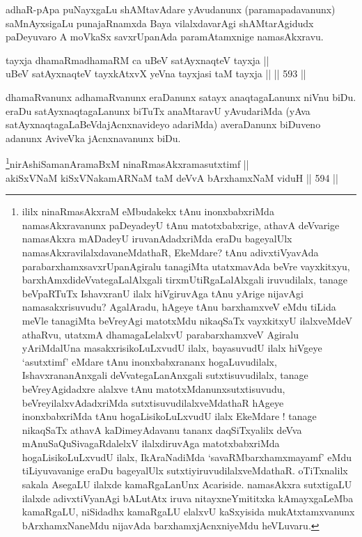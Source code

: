 \begin{artha}
adhaR-pApa puNayxgaLu shAMtavAdare yAvudanunx
(paramapadavanunx) saMnAyxsigaLu punajaRnamxda Baya vilalxdavarAgi
shAMtarAgidudx paDeyuvaro A moVkaSx savxrUpanAda paramAtamxnige
namasAkxravu.
\end{artha}


\begin{shl}
tayxja dhamaRmadhamaRM ca uBeV satAyxnaqteV tayxja || \\
uBeV satAyxnaqteV tayxkAtxvX yeVna tayxjasi taM tayxja ||  \hfill || 593 ||  
\end{shl}

\begin{artha}
dhamaRvanunx adhamaRvanunx eraDanunx satayx anaqtagaLanunx niVnu
biDu. eraDu satAyxnaqtagaLanunx biTuTx anaMtaravU yAvudariMda (yAva
satAyxnaqtagaLaBeVdajAcnxnavideyo adariMda) averaDanunx biDuveno
adanunx AviveVka jAcnxnavanunx biDu.
\end{artha}


\begin{shl}
\footnote{ililx ninaRmasAkxraM eMbudakekx tAnu inonxbabxriMda
namasAkxravanunx paDeyadeyU tAnu matotxbabxrige, athavA deVvarige
namasAkxra mADadeyU iruvanAdadxriMda eraDu bageyalUlx
namasAkxravilalxdavaneMdathaR, EkeMdare? tAnu adivxtiVyavAda
parabarxhamxsavxrUpanAgiralu tanagiMta utatxmavAda beVre vayxkitxyu,
barxhAmxdideVvategaLalAlxgali tirxmUtiRgaLalAlxgali iruvudilalx,
tanage beVpaRTuTx IshavxranU ilalx hiVgiruvAga tAnu yArige nijavAgi
namasakxrisuvudu? AgalAradu, hAgeye tAnu barxhamxveV eMdu tiLida
meVle tanagiMta beVreyAgi matotxMdu nikaqSaTx vayxkitxyU ilalxveMdeV
athaRvu, utatxmA dhamagaLelalxvU parabarxhamxveV Agiralu yAriMdalUna
masakxrisikoLuLxvudU ilalx, bayasuvudU ilalx hiVgeye `asutxtimf'
eMdare tAnu inonxbabxrananx hogaLuvudilalx, IshavxrananAnxgali
deVvategaLanAnxgali sutxtisuvudilalx, tanage beVreyAgidadxre alalxve
tAnu matotxMdanunxsutxtisuvudu, beVreyilalxvAdadxriMda
sutxtisuvudilalxveMdathaR hAgeye inonxbabxriMda tAnu
hogaLisikoLuLxvudU ilalx EkeMdare ! tanage nikaqSaTx athavA
kaDimeyAdavanu tananx daqSiTxyalilx deVva mAnuSaQuSivagaRdalelxV
ilalxdiruvAga matotxbabxriMda hogaLisikoLuLxvudU ilalx, IkAraNadiMda
`savaRMbarxhamxmayamf' eMdu tiLiyuvavanige eraDu bageyalUlx
sutxtiyiruvudilalxveMdathaR. oTiTxnalilx sakala AsegaLU ilalxde
kamaRgaLanUnx Acariside. namasAkxra sutxtigaLU ilalxde
adivxtiVyanAgi bALutAtx iruva nitayxneYmititxka kAmayxgaLeMba
kamaRgaLU, niSidadhx kamaRgaLU elalxvU kaSxyisida mukAtxtamxvanunx
bArxhamxNaneMdu nijavAda barxhamxjAcnxniyeMdu heVLuvaru.}nirAshiSamanAramaBxM ninaRmasAkxramasutxtimf || \\
akiSxVNaM kiSxVNakamARNaM taM deVvA bArxhamxNaM viduH \hfill || 594 ||  
\end{shl}


